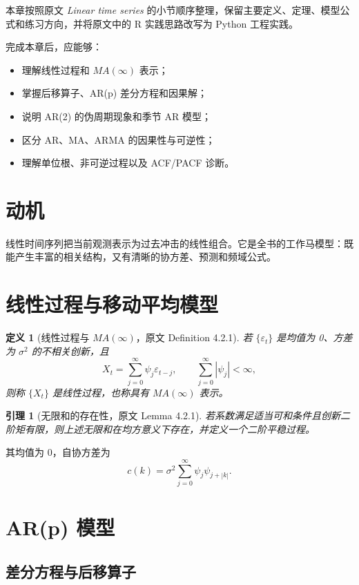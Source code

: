 \documentclass[11pt,a4paper,openany]{ctexbook}
\newtheorem{definition}{定义}[section]
\newtheorem{lemma}{引理}[section]
\begin{document}
本章按照原文 \textit{Linear time series} 的小节顺序整理，保留主要定义、定理、模型公式和练习方向，并将原文中的 R 实践思路改写为 Python 工程实践。

完成本章后，应能够：
\begin{itemize}
  \item 理解线性过程和 \(MA(\infty)\) 表示；
  \item 掌握后移算子、AR(p) 差分方程和因果解；
  \item 说明 AR(2) 的伪周期现象和季节 AR 模型；
  \item 区分 AR、MA、ARMA 的因果性与可逆性；
  \item 理解单位根、非可逆过程以及 ACF/PACF 诊断。
\end{itemize}

\section{动机}

线性时间序列把当前观测表示为过去冲击的线性组合。它是全书的工作马模型：既能产生丰富的相关结构，又有清晰的协方差、预测和频域公式。

\section{线性过程与移动平均模型}

\begin{definition}[线性过程与 \(MA(\infty)\)，原文 Definition 4.2.1]
若 \(\{\varepsilon_t\}\) 是均值为 0、方差为 \(\sigma^2\) 的不相关创新，且
\[
  X_t=\sum_{j=0}^{\infty}\psi_j\varepsilon_{t-j},
  \qquad \sum_{j=0}^{\infty}|\psi_j|<\infty,
\]
则称 \(\{X_t\}\) 是线性过程，也称具有 \(MA(\infty)\) 表示。
\end{definition}

\begin{lemma}[无限和的存在性，原文 Lemma 4.2.1]
若系数满足适当可和条件且创新二阶矩有限，则上述无限和在均方意义下存在，并定义一个二阶平稳过程。
\end{lemma}

其均值为 0，自协方差为
\[
  c(k)=\sigma^2\sum_{j=0}^{\infty}\psi_j\psi_{j+|k|}.
\]

\section{AR(p) 模型}

\subsection{差分方程与后移算子}
\end{document}
